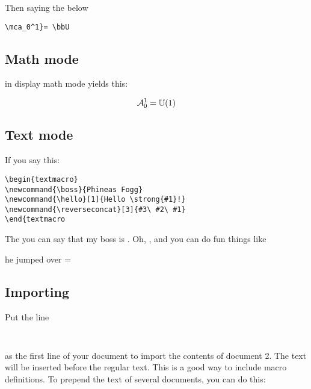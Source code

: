Then saying the below

\begin{verbatim}
\mca_0^1}= \bbU
\end{verbatim}

\subsection{Math mode}

in display math mode yields this:

$$
\mathcal{A}_0^1 = \mathbb{U}(1)
$$


\subsection{Text mode}

\begin{textmacro}
\newcommand{\boss}{Phineas Fogg}
\newcommand{\hello}[1]{Hello \strong{#1}!}
\newcommand{\reverseconcat}[3]{#3#2#1}
\end{textmacro}


If you say this:

\begin{verbatim}
\begin{textmacro}
\newcommand{\boss}{Phineas Fogg}
\newcommand{\hello}[1]{Hello \strong{#1}!}
\newcommand{\reverseconcat}[3]{#3\ #2\ #1}
\end{textmacro
\end{verbatim}

The you can say that my boss is \boss. Oh, , and you can do fun things like

\begin{center}
he jumped over = 
\end{center}

\subsection{Importing}

Put the line

\begin{verbatim}
  
\end{verbatim}

as the first line of your document to import the contents of document 2.  The text will be inserted before the regular text.  This is a good way to include macro definitions.  To prepend the text of several documents, you can do this:

\begin{verbatim}
  
\end{verbatim}

